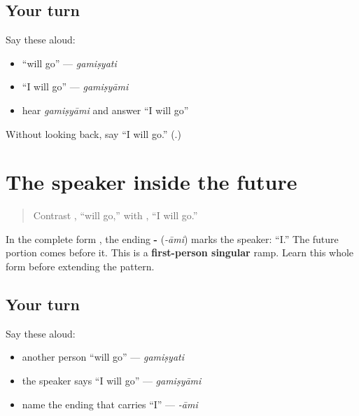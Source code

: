 \subsection*{Your turn}
Say these aloud:

\begin{itemize}
\raggedright
  \item “will go” — \emph{gamiṣyati}
  \item “I will go” — \emph{gamiṣyāmi}
  \item hear \emph{gamiṣyāmi} and answer “I will go”
\end{itemize}

\begin{tcolorbox}[breakable,colback=teal!4,colframe=teal!35!black,title={Before you move on}]
Without looking back, say “I will go.” (\textbf{}.)
\end{tcolorbox}
\section[(first-person singular future)]{The speaker inside the future}

\label{lesson:SA-C263-first-person-future}



\begin{quote}
Contrast \textbf{}, “will go,” with \textbf{}, “I will go.”
\end{quote}

\begin{grammarlens}[title={Grammar Lens: first-person singular}]
In the complete form \textbf{}, the ending \textbf{-} (\emph{-āmi}) marks the speaker: “I.” The future portion comes before it. This is a \textbf{first-person singular} ramp. Learn this whole form before extending the pattern.
\end{grammarlens}

\subsection*{Your turn}
Say these aloud:

\begin{itemize}
\raggedright
  \item another person “will go” — \emph{gamiṣyati}
  \item the speaker says “I will go” — \emph{gamiṣyāmi}
  \item name the ending that carries “I” — \emph{-āmi}
\end{itemize}

